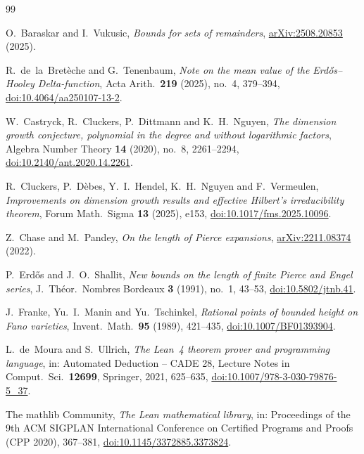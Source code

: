 \documentclass[11pt]{article}
\theoremstyle{definition}
\theoremstyle{remark}
\begin{document}
\begin{thebibliography}{99}

O.~Baraskar and I.~Vukusic,
\emph{Bounds for sets of remainders},
\href{https://arxiv.org/abs/2508.20853}{arXiv:2508.20853} (2025).

R.~de~la~Bret\`eche and G.~Tenenbaum,
\emph{Note on the mean value of the Erd\H{o}s--Hooley Delta-function},
Acta Arith.\ \textbf{219} (2025), no.~4, 379--394,
\href{https://doi.org/10.4064/aa250107-13-2}{doi:10.4064/aa250107-13-2}.

W.~Castryck, R.~Cluckers, P.~Dittmann and K.~H.~Nguyen,
\emph{The dimension growth conjecture, polynomial in the degree and without logarithmic factors},
Algebra Number Theory \textbf{14} (2020), no.~8, 2261--2294,
\href{https://doi.org/10.2140/ant.2020.14.2261}{doi:10.2140/ant.2020.14.2261}.

R.~Cluckers, P.~D\`ebes, Y.~I.~Hendel, K.~H.~Nguyen and F.~Vermeulen,
\emph{Improvements on dimension growth results and effective Hilbert's irreducibility theorem},
Forum Math.\ Sigma \textbf{13} (2025), e153,
\href{https://doi.org/10.1017/fms.2025.10096}{doi:10.1017/fms.2025.10096}.

Z.~Chase and M.~Pandey,
\emph{On the length of Pierce expansions},
\href{https://arxiv.org/abs/2211.08374}{arXiv:2211.08374} (2022).

P.~Erd\H{o}s and J.~O.~Shallit,
\emph{New bounds on the length of finite Pierce and Engel series},
J.\ Th\'eor.\ Nombres Bordeaux \textbf{3} (1991), no.~1, 43--53,
\href{https://doi.org/10.5802/jtnb.41}{doi:10.5802/jtnb.41}.

J.~Franke, Yu.~I.~Manin and Yu.~Tschinkel,
\emph{Rational points of bounded height on Fano varieties},
Invent.\ Math.\ \textbf{95} (1989), 421--435,
\href{https://doi.org/10.1007/BF01393904}{doi:10.1007/BF01393904}.

L.~de~Moura and S.~Ullrich,
\emph{The Lean~4 theorem prover and programming language},
in: Automated Deduction -- CADE 28, Lecture Notes in Comput.\ Sci.\ \textbf{12699},
Springer, 2021, 625--635,
\href{https://doi.org/10.1007/978-3-030-79876-5_37}{doi:10.1007/978-3-030-79876-5\_37}.

The mathlib Community,
\emph{The Lean mathematical library},
in: Proceedings of the 9th ACM SIGPLAN International Conference on Certified Programs and
Proofs (CPP 2020), 367--381,
\href{https://doi.org/10.1145/3372885.3373824}{doi:10.1145/3372885.3373824}.


\end{thebibliography}
\end{document}
